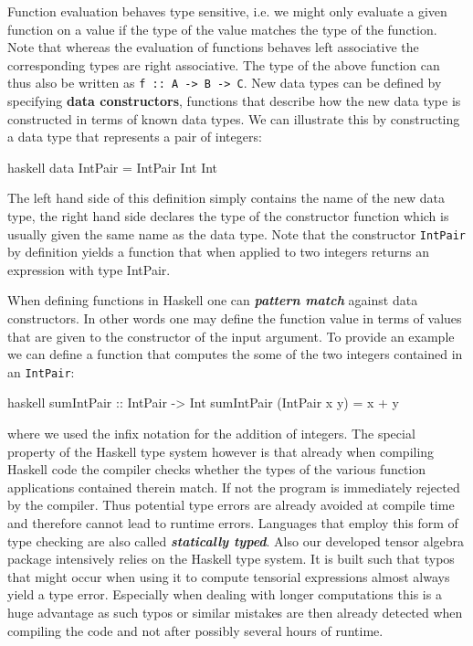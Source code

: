 \documentclass[a4paper,12pt, DIV=14, BCOR=5mm, twoside, headsepline]{scrbook}
\begin{document}
Function evaluation behaves type sensitive, i.e. we might only evaluate a given function on a value if the type of the value matches the type of the function.
Note that whereas the evaluation of functions behaves left associative the corresponding types are right associative. The type of the above function can thus also be written as \texttt{f :: A -> B -> C}.
New data types can be defined by specifying \textbf{\textbf{data constructors}}, functions that describe how the new data type is constructed in terms of known data types. We can illustrate this by constructing a data type that represents a pair of integers:
\begin{center}
\begin{cminted}{haskell}
data IntPair = IntPair Int Int 
\end{cminted}
\end{center}
The left hand side of this definition simply contains the name of the new data type, the right hand side declares the type of the constructor function which is usually given the same name as the data type. 
Note that the constructor \texttt{IntPair} by definition yields a function that when applied to two integers returns an expression with type IntPair. 

When defining functions in Haskell one can \textbf{\textit{pattern match}} against data constructors. In other words one may define the function value in terms of values that are given to the constructor of the input argument. To provide an example we can define a function that computes the some of the two integers contained in an \texttt{IntPair}:
\begin{center}
\begin{cminted}{haskell}
sumIntPair :: IntPair -> Int 
sumIntPair (IntPair x y) = x + y
\end{cminted}
\end{center}
where we used the infix notation for the addition of integers. 
The special property of the Haskell type system however is that already when compiling Haskell code the compiler checks whether the types of the various function applications contained therein match. If not the program is immediately rejected by the compiler. Thus potential type errors are already avoided at compile time and therefore cannot lead to runtime errors. Languages that employ this form of type checking are also called \textit{\textbf{statically typed}}. Also our developed tensor algebra package intensively relies on the Haskell type system. It is built such that typos that might occur when using it to compute tensorial expressions almost always yield a type error. Especially when dealing with longer computations this is a huge advantage as such typos or similar mistakes are then already detected when compiling the code and not after possibly several hours of runtime.  
\end{document}
